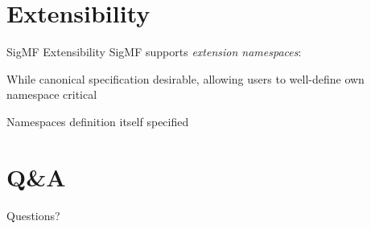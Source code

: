 \section{Extensibility}
\begin{frame}{SigMF Extensibility}
 SigMF supports \emph{extension namespaces}:

While canonical specification desirable, allowing users to well-define own namespace critical

Namespaces definition itself specified
\end{frame}


\section*{Q\&A}
\begin{frame}{Questions?}
  
\end{frame}
